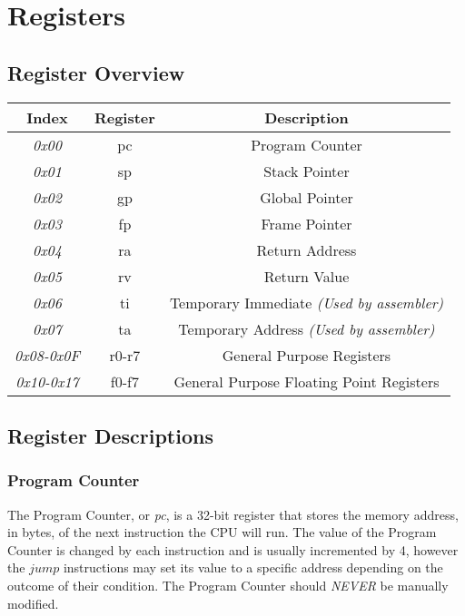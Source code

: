 \section{Registers}

\subsection{Register Overview}

\begin{center}
	\begin{tabular}{|c|c|c|}
		\hline
		\textbf{Index} & \textbf{Register} & \textbf{Description} \\
		\hline
		\textit{0x00} & pc & Program Counter \\
		\hline
		\textit{0x01} & sp & Stack Pointer \\
		\hline
		\textit{0x02} & gp & Global Pointer \\
		\hline
		\textit{0x03} & fp & Frame Pointer \\
		\hline
		\textit{0x04} & ra & Return Address \\
		\hline
		\textit{0x05} & rv & Return Value \\
		\hline
		\textit{0x06} & ti & Temporary Immediate \textit{(Used by assembler)} \\
		\hline
		\textit{0x07} & ta & Temporary Address \textit{(Used by assembler)} \\
		\hline
		\textit{0x08-0x0F} & r0-r7 & General Purpose Registers \\
		\hline
		\textit{0x10-0x17} & f0-f7 & General Purpose Floating Point Registers \\
		\hline
	\end{tabular}
\end{center}
	
\subsection{Register Descriptions}

\subsubsection{Program Counter}
The Program Counter, or \textit{pc}, is a 32-bit register that stores the memory address, in bytes, of the next instruction the CPU will run.
The value of the Program Counter is changed by each instruction and is usually incremented by 4, however the $jump$ instructions may set its value to a specific address depending on the outcome of their condition.
The Program Counter should \textit{NEVER} be manually modified.

